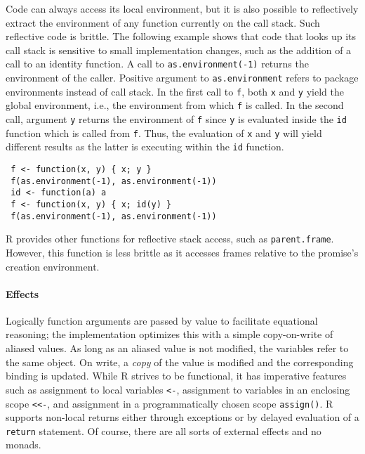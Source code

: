 \documentclass[review,screen,acmsmall]{acmart}
\newcommand{\code}[1]{\lstinline |#1|\xspace}
\renewcommand{\c}[1]{\lstinline |#1|\xspace}
\begin{document}
Code can always access its local environment, but it is also possible to
reflectively extract the environment of any function currently on the call
stack. Such reflective code is brittle. The following example shows that code
that looks up its call stack is sensitive to small implementation changes, such
as the addition of a call to an identity function. A call to
\code{as.environment(-1)} returns the environment of the caller. Positive
argument to \code{as.environment} refers to package environments instead of call
stack. In the first call to \code{f}, both \c x and \c y yield the global
environment, i.e., the environment from which \code{f} is called. In the second
call, argument \c y returns the environment of \c f since \c y is evaluated
inside the \c{id} function which is called from \c f. Thus, the evaluation of \c
x and \c y will yield different results as the latter is executing within the
\c{id} function.
% 
\begin{lstlisting}
 f <- function(x, y) { x; y }
 f(as.environment(-1), as.environment(-1))
 id <- function(a) a
 f <- function(x, y) { x; id(y) }
 f(as.environment(-1), as.environment(-1))
\end{lstlisting}

R provides other functions for reflective stack access, such as
\c{parent.frame}. However, this function is less brittle as it accesses frames
relative to the promise's creation environment.

\paragraph{Effects} Logically function arguments are passed by value to
facilitate equational reasoning; the implementation optimizes this with a simple
copy-on-write of aliased values. As long as an aliased value is not modified,
the variables refer to the same object. On write, a \textit{copy} of the value
is modified and the corresponding binding is updated. While R strives to be
functional, it has imperative features such as assignment to local variables
\c{<-}, assignment to variables in an enclosing scope \c{<<-}, and assignment in
a programmatically chosen scope \c{assign()}. R supports non-local returns
either through exceptions or by delayed evaluation of a \c{return} statement. Of
course, there are all sorts of external effects and no monads.
\end{document}
